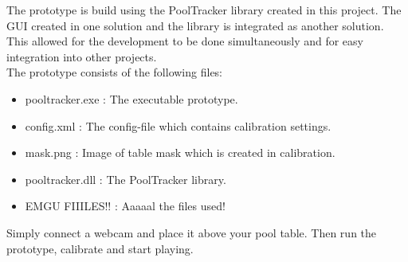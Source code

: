 The prototype is build using the PoolTracker library created in this project. The GUI created in one solution and the library is integrated as another solution. This allowed for the development to be done simultaneously and for easy integration into other projects.\\

The prototype consists of the following files:
\begin{itemize}
	\item pooltracker.exe : The executable prototype.
	\item config.xml	  : The config-file which contains calibration settings.
	\item mask.png		  : Image of table mask which is created in calibration.
	\item pooltracker.dll : The PoolTracker library.
	\item EMGU FIIILES!!  : Aaaaal the files used!
\end{itemize}

Simply connect a webcam and place it above your pool table. Then run the prototype, calibrate and start playing.